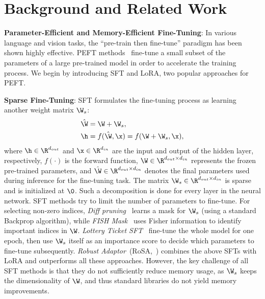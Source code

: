 \section{Background and Related Work}
\label{sec:related}

\textbf{Parameter-Efficient and Memory-Efficient Fine-Tuning}: In various language and vision tasks, the ``pre-train then fine-tune'' paradigm has been shown highly effective. PEFT methods~\cite{lialin2023scaling} fine-tune a small subset of the parameters of a large pre-trained model in order to accelerate the training process. We begin by introducing SFT and LoRA, two popular approaches for PEFT. 

\textbf{Sparse Fine-Tuning}: SFT formulates the fine-tuning process as learning another weight matrix $\W_s$: 
\begin{align}
     &\hat{\W}=\W + \W_s, \label{eq:sft_w}
     \\&\h = f(\hat{\W},\x) = f(\W + \W_s, \x), \label{eq:sft_fwd}
\end{align}
where $\h\in\R^{d_{out}}$ and $\x\in\R^{d_{in}}$ are the input and output of the hidden layer, respectively, $f(\cdot)$ is the forward function, $\W\in \R^{d_{out}\times d_{in}}$ represents the frozen pre-trained parameters, and $\hat{\W}\in \R^{d_{out}\times d_{in}}$ denotes the final parameters used during inference for the fine-tuning task.  %
The matrix $\W_s\in \R^{d_{out}\times d_{in}}$ is sparse and is initialized at $\0$. Such a decomposition is done for every layer in the neural network. SFT methods try to limit the number of parameters to fine-tune. For selecting non-zero indices, \emph{Diff pruning}~\cite{guo2021parameter} learns a mask for $\W_s$ (using a standard Backprop algorithm), while \emph{FISH Mask}~\cite{sung2021training} uses Fisher information to identify important indices in $\W$. \emph{Lottery Ticket SFT}~\cite{ansell2022composable} fine-tune the whole model for one epoch, then use $\W_s$ itself as an importance score to decide which parameters to fine-tune subsequently. \emph{Robust Adaptor}~(RoSA,~\citealt{nikdan2024rosa}) combines the above SFTs with LoRA and outperforms all these approaches.
However, the key challenge of all SFT methods is that they do not sufficiently reduce memory usage, as $\W_s$ keeps the dimensionality of $\W$, and thus standard libraries do not yield memory improvements. %

